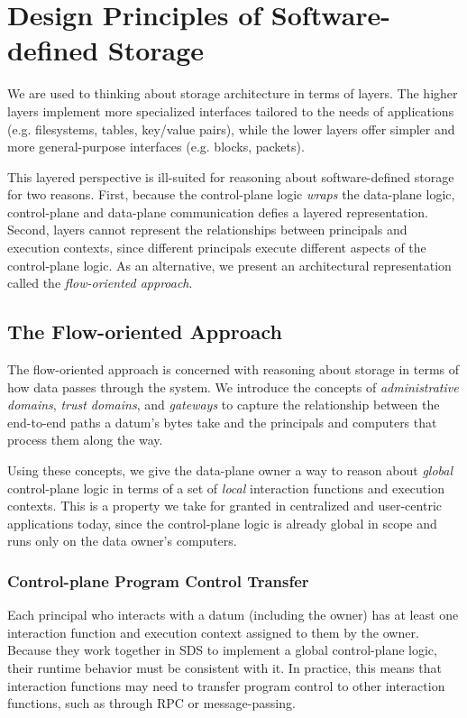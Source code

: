 \chapter{Design Principles of Software-defined Storage}
\label{chap:design_principles}

We are used to thinking about storage architecture in terms of layers.
The higher layers implement more specialized interfaces tailored to the needs of
applications (e.g. filesystems, tables, key/value pairs),
while the lower layers offer simpler and more general-purpose interfaces (e.g.
blocks, packets).

This layered perspective is ill-suited for reasoning about
software-defined storage for two reasons.  First, because
the control-plane logic \emph{wraps} the
data-plane logic, control-plane and data-plane communication defies
a layered representation.  Second,
layers cannot represent the relationships between principals and execution
contexts, since different principals execute different aspects of the
control-plane logic.  As an alternative, we present an architectural
representation called the \emph{flow-oriented approach}.

\section{The Flow-oriented Approach}

The flow-oriented approach is concerned with reasoning about storage in terms of
how data passes through the system.  We introduce the concepts of
\emph{administrative domains}, \emph{trust domains}, and \emph{gateways}
to capture the relationship between the
end-to-end paths a datum's bytes take and the principals and computers that
process them along the way.

Using these concepts, we give the data-plane owner
a way to reason about \emph{global} control-plane logic in terms of a set
of \emph{local} interaction functions and execution contexts.
This is a property we take for granted
in centralized and user-centric applications today, since the control-plane
logic is already global in scope and runs only on the data owner's computers.

\subsection{Control-plane Program Control Transfer}

Each principal who interacts with a datum (including the owner) has at least one
interaction function and execution context assigned to them by the owner.  Because
they work together in SDS to implement a global control-plane logic, their
runtime behavior must be consistent with it.  In practice,
this means that interaction functions may need to transfer
program control to other interaction functions, such as through RPC or
message-passing.

